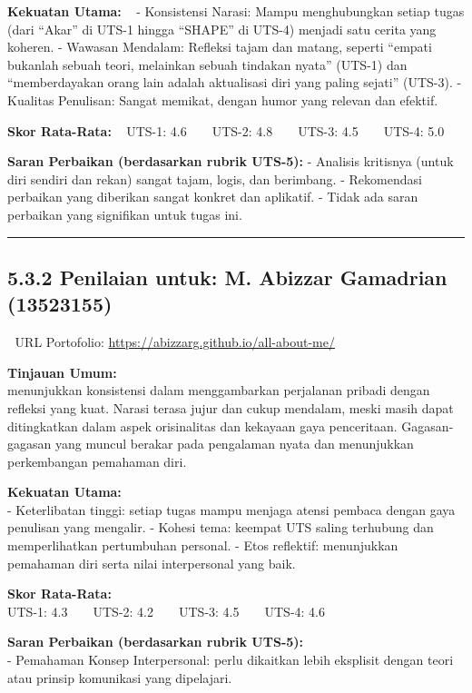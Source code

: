 \documentclass[
  letterpaper,
  DIV=11,
  numbers=noendperiod]{scrreprt}
\begin{document}
\textbf{Kekuatan Utama:} ~ - Konsistensi Narasi: Mampu menghubungkan
setiap tugas (dari ``Akar'' di UTS-1 hingga ``SHAPE'' di UTS-4) menjadi
satu cerita yang koheren. - Wawasan Mendalam: Refleksi tajam dan matang,
seperti ``empati bukanlah sebuah teori, melainkan sebuah tindakan
nyata'' (UTS-1) dan ``memberdayakan orang lain adalah aktualisasi diri
yang paling sejati'' (UTS-3). - Kualitas Penulisan: Sangat memikat,
dengan humor yang relevan dan efektif.

\textbf{Skor Rata-Rata:} ~ UTS-1: 4.6 \textbar{} UTS-2:
4.8 \textbar{} UTS-3: 4.5 \textbar{} UTS-4: 5.0

\textbf{Saran Perbaikan (berdasarkan rubrik UTS-5):} - Analisis
kritisnya (untuk diri sendiri dan rekan) sangat tajam, logis, dan
berimbang. - Rekomendasi perbaikan yang diberikan sangat konkret dan
aplikatif. - Tidak ada saran perbaikan yang signifikan untuk tugas ini.

\begin{center}\rule{0.5\linewidth}{0.5pt}\end{center}

\subsection{5.3.2 Penilaian untuk: M. Abizzar Gamadrian
(13523155)}\label{penilaian-untuk-m.-abizzar-gamadrian-13523155}

🔗 URL Portofolio: \url{https://abizzarg.github.io/all-about-me/}

\textbf{Tinjauan Umum:}\\
menunjukkan konsistensi dalam menggambarkan perjalanan pribadi dengan
refleksi yang kuat. Narasi terasa jujur dan cukup mendalam, meski masih
dapat ditingkatkan dalam aspek orisinalitas dan kekayaan gaya
penceritaan. Gagasan-gagasan yang muncul berakar pada pengalaman nyata
dan menunjukkan perkembangan pemahaman diri.

\textbf{Kekuatan Utama:}\\
- Keterlibatan tinggi: setiap tugas mampu menjaga atensi pembaca dengan
gaya penulisan yang mengalir. - Kohesi tema: keempat UTS saling
terhubung dan memperlihatkan pertumbuhan personal. - Etos reflektif:
menunjukkan pemahaman diri serta nilai interpersonal yang baik.

\textbf{Skor Rata-Rata:}\\
UTS-1: 4.3 \textbar{} UTS-2: 4.2 \textbar{} UTS-3: 4.5 \textbar{} UTS-4:
4.6

\textbf{Saran Perbaikan (berdasarkan rubrik UTS-5):}\\
- Pemahaman Konsep Interpersonal: perlu dikaitkan lebih eksplisit dengan
teori atau prinsip komunikasi yang dipelajari.
\end{document}
